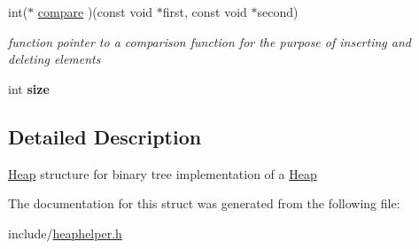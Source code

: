 \begin{DoxyCompactItemize}
\mbox{\label{structHeap_ab11468cee0bf82183a92cf2fa8bab107}} 
int($\ast$ \hyperlink{structHeap_ab11468cee0bf82183a92cf2fa8bab107}{compare} )(const void $\ast$first, const void $\ast$second)
\begin{DoxyCompactList}\small\item\em function pointer to a comparison function for the purpose of inserting and deleting elements \end{DoxyCompactList}\item 
\mbox{\label{structHeap_ac291cf589f86e95198621d33e21a05a6}} 
int {\bfseries size}
\end{DoxyCompactItemize}


\subsection{Detailed Description}
\hyperlink{structHeap}{Heap} structure for binary tree implementation of a \hyperlink{structHeap}{Heap} 

The documentation for this struct was generated from the following file\+:\begin{DoxyCompactItemize}
\item 
include/\hyperlink{heaphelper_8h}{heaphelper.\+h}\end{DoxyCompactItemize}
